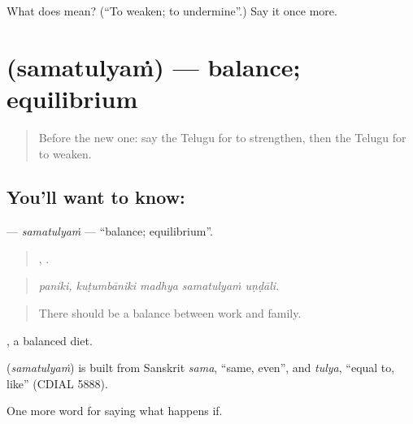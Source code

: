 \begin{tcolorbox}[breakable,colback=teal!4,colframe=teal!35!black,title={Before you move on}]
What does  mean? (\textquotedblleft{}To weaken; to undermine\textquotedblright{}.) Say it once more.
\end{tcolorbox}
\section[\texorpdfstring{\te{సమతుల్యం} (samatulyaṁ)}{సమతుల్యం (samatulyaṁ)}]{ (samatulyaṁ) — balance; equilibrium}

\label{lesson:TE-C430-samatulyam}



\begin{quote}
Before the new one: say the Telugu for to strengthen, then the Telugu for to weaken.
\end{quote}

\subsection*{You'll want to know: }
\textbf{} — \emph{samatulyaṁ} — \textquotedblleft{}balance; equilibrium\textquotedblright{}.

\begin{quote}
,    .
\end{quote}

\begin{quote}
\emph{paniki, kuṭumbāniki madhya samatulyaṁ uṇḍāli.}
\end{quote}

\begin{quote}
There should be a balance between work and family.
\end{quote}

 , a balanced diet.

\begin{cousinweb}
\textbf{} (\emph{samatulyaṁ}) is built from Sanskrit \emph{sama}, \textquotedblleft{}same, even\textquotedblright{}, and \emph{tulya}, \textquotedblleft{}equal to, like\textquotedblright{} (CDIAL 5888).
\end{cousinweb}

\begin{grammarlens}[title={What you've built}]
One more word for saying what happens if.
\end{grammarlens}

